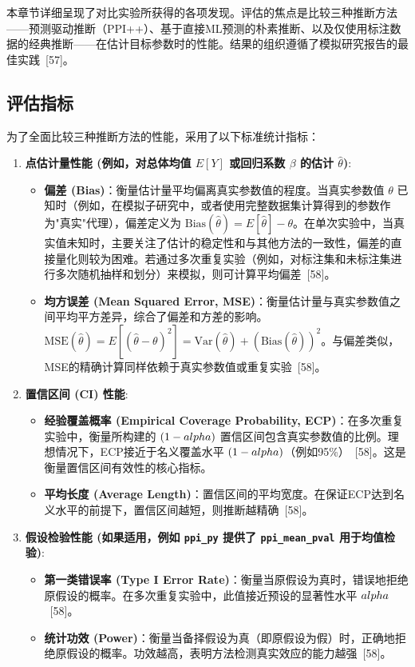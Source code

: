 \documentclass[12pt,a4paper]{article}
\begin{document}
本章节详细呈现了对比实验所获得的各项发现。评估的焦点是比较三种推断方法——预测驱动推断（PPI++）、基于直接ML预测的朴素推断、以及仅使用标注数据的经典推断——在估计目标参数时的性能。结果的组织遵循了模拟研究报告的最佳实践~{[57]}。

\subsection{评估指标}
\label{sec:evaluation_metrics}
为了全面比较三种推断方法的性能，采用了以下标准统计指标：
\begin{enumerate}
    \item \textbf{点估计量性能 (例如，对总体均值 $E[Y]$ 或回归系数 $\beta$ 的估计 $\hat{\theta}$)}:
    \begin{itemize}
        \item \textbf{偏差 (Bias)}：衡量估计量平均偏离真实参数值的程度。当真实参数值 $\theta$ 已知时（例如，在模拟子研究中，或者使用完整数据集计算得到的参数作为"真实"代理），偏差定义为 $\text{Bias}(\hat{\theta})=E[\hat{\theta}]-\theta$。在单次实验中，当真实值未知时，主要关注了估计的稳定性和与其他方法的一致性，偏差的直接量化则较为困难。若通过多次重复实验（例如，对标注集和未标注集进行多次随机抽样和划分）来模拟，则可计算平均偏差~{[58]}。
        \item \textbf{均方误差 (Mean Squared Error, MSE)}：衡量估计量与真实参数值之间平均平方差异，综合了偏差和方差的影响。$\text{MSE}(\hat{\theta})=E[(\hat{\theta}-\theta)^2]=\text{Var}(\hat{\theta})+(\text{Bias}(\hat{\theta}))^2$。与偏差类似，MSE的精确计算同样依赖于真实参数值或重复实验~{[58]}。
    \end{itemize}
    \item \textbf{置信区间 (CI) 性能}:
    \begin{itemize}
        \item \textbf{经验覆盖概率 (Empirical Coverage Probability, ECP)}：在多次重复实验中，衡量所构建的 $(1-\\alpha)$ 置信区间包含真实参数值的比例。理想情况下，ECP接近于名义覆盖水平 $(1-\\alpha)$（例如95\%）~{[58]}。这是衡量置信区间有效性的核心指标。
        \item \textbf{平均长度 (Average Length)}：置信区间的平均宽度。在保证ECP达到名义水平的前提下，置信区间越短，则推断越精确~{[58]}。
    \end{itemize}
    \item \textbf{假设检验性能 (如果适用，例如 \texttt{ppi\_py} 提供了 \texttt{ppi\_mean\_pval} 用于均值检验)}:
    \begin{itemize}
        \item \textbf{第一类错误率 (Type I Error Rate)}：衡量当原假设为真时，错误地拒绝原假设的概率。在多次重复实验中，此值接近预设的显著性水平 $\\alpha$~{[58]}。
        \item \textbf{统计功效 (Power)}：衡量当备择假设为真（即原假设为假）时，正确地拒绝原假设的概率。功效越高，表明方法检测真实效应的能力越强~{[58]}。
    \end{itemize}
\end{enumerate}
\end{document}
